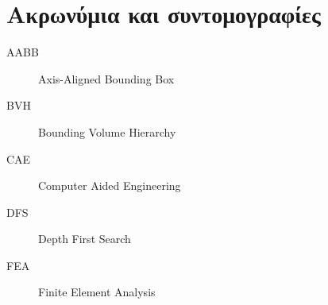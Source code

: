 \chapter{Ακρωνύμια και συντομογραφίες}

\begin{description}
  \item[AABB] Axis-Aligned Bounding Box
  \item[BVH] Bounding Volume Hierarchy
  \item[CAE] Computer Aided Engineering
  \item[DFS] Depth First Search
  \item[FEA] Finite Element Analysis
\end{description}
